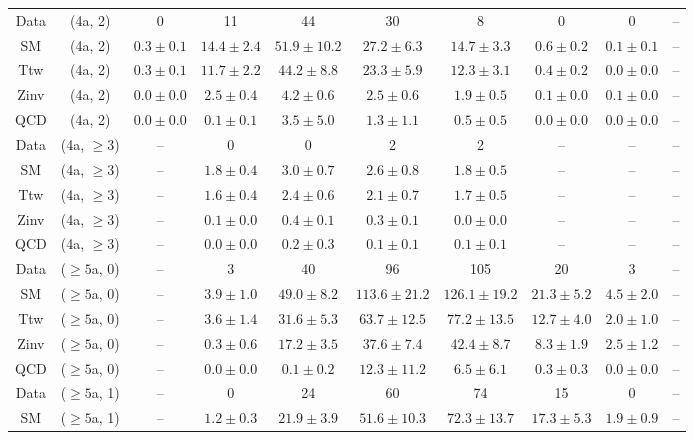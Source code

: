 \begin{table}[h!]
{\begin{tabular}{cccccccccc}
	Data & (4a, 2) & 0 & 11 & 44 & 30 & 8 & 0 & 0 & -- \\[0.5ex] 
	SM & (4a, 2) & $0.3\pm 0.1$ & $14.4\pm 2.4$ & $51.9\pm 10.2$ & $27.2\pm 6.3$ & $14.7\pm 3.3$ & $0.6\pm 0.2$ & $0.1\pm 0.1$ & -- \\[0.5ex] 
	Ttw & (4a, 2) & $0.3\pm 0.1$ & $11.7\pm 2.2$ & $44.2\pm 8.8$ & $23.3\pm 5.9$ & $12.3\pm 3.1$ & $0.4\pm 0.2$ & $0.0\pm 0.0$ & -- \\[0.5ex] 
	Zinv & (4a, 2) & $0.0\pm 0.0$ & $2.5\pm 0.4$ & $4.2\pm 0.6$ & $2.5\pm 0.6$ & $1.9\pm 0.5$ & $0.1\pm 0.0$ & $0.1\pm 0.0$ & -- \\[0.5ex] 
	QCD & (4a, 2) & $0.0\pm 0.0$ & $0.1\pm 0.1$ & $3.5\pm 5.0$ & $1.3\pm 1.1$ & $0.5\pm 0.5$ & $0.0\pm 0.0$ & $0.0\pm 0.0$ & -- \\[0.5ex] 
	Data & (4a, $\ge3$) & -- & 0 & 0 & 2 & 2 & -- & -- & -- \\[0.5ex] 
	SM & (4a, $\ge3$) & -- & $1.8\pm 0.4$ & $3.0\pm 0.7$ & $2.6\pm 0.8$ & $1.8\pm 0.5$ & -- & -- & -- \\[0.5ex] 
	Ttw & (4a, $\ge3$) & -- & $1.6\pm 0.4$ & $2.4\pm 0.6$ & $2.1\pm 0.7$ & $1.7\pm 0.5$ & -- & -- & -- \\[0.5ex] 
	Zinv & (4a, $\ge3$) & -- & $0.1\pm 0.0$ & $0.4\pm 0.1$ & $0.3\pm 0.1$ & $0.0\pm 0.0$ & -- & -- & -- \\[0.5ex] 
	QCD & (4a, $\ge3$) & -- & $0.0\pm 0.0$ & $0.2\pm 0.3$ & $0.1\pm 0.1$ & $0.1\pm 0.1$ & -- & -- & -- \\[0.5ex] 
	Data & ($\ge5$a, 0) & -- & 3 & 40 & 96 & 105 & 20 & 3 & -- \\[0.5ex] 
	SM & ($\ge5$a, 0) & -- & $3.9\pm 1.0$ & $49.0\pm 8.2$ & $113.6\pm 21.2$ & $126.1\pm 19.2$ & $21.3\pm 5.2$ & $4.5\pm 2.0$ & -- \\[0.5ex] 
	Ttw & ($\ge5$a, 0) & -- & $3.6\pm 1.4$ & $31.6\pm 5.3$ & $63.7\pm 12.5$ & $77.2\pm 13.5$ & $12.7\pm 4.0$ & $2.0\pm 1.0$ & -- \\[0.5ex] 
	Zinv & ($\ge5$a, 0) & -- & $0.3\pm 0.6$ & $17.2\pm 3.5$ & $37.6\pm 7.4$ & $42.4\pm 8.7$ & $8.3\pm 1.9$ & $2.5\pm 1.2$ & -- \\[0.5ex] 
	QCD & ($\ge5$a, 0) & -- & $0.0\pm 0.0$ & $0.1\pm 0.2$ & $12.3\pm 11.2$ & $6.5\pm 6.1$ & $0.3\pm 0.3$ & $0.0\pm 0.0$ & -- \\[0.5ex] 
	Data & ($\ge5$a, 1) & -- & 0 & 24 & 60 & 74 & 15 & 0 & -- \\[0.5ex] 
	SM & ($\ge5$a, 1) & -- & $1.2\pm 0.3$ & $21.9\pm 3.9$ & $51.6\pm 10.3$ & $72.3\pm 13.7$ & $17.3\pm 5.3$ & $1.9\pm 0.9$ & -- \\[0.5ex] 

\end{tabular}}
\end{table}
